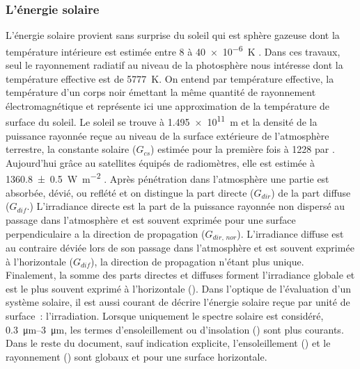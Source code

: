 \subsubsection{L’énergie solaire} %
\label{ssub:l_energie_solaire}
L’énergie solaire provient sans surprise du soleil qui est sphère gazeuse
dont  la température intérieure est estimée entre \num{8} à \SI{40e-6}{\kelvin}
\parencite{Duffie1980}. Dans ces travaux, seul le rayonnement radiatif au niveau de la
photosphère nous intéresse dont la température effective est de \SI{5777}{\kelvin}. On
entend par température effective, la température d’un corps noir émettant la même quantité
de rayonnement électromagnétique et représente ici une approximation de la température de
surface du soleil.
Le soleil se trouve à \SI{1.495e11}{\metre} et la densité de la
puissance rayonnée reçue au niveau de la surface extérieure de l’atmosphère terrestre, la
constante solaire ($G_{cs}$) estimée pour la première fois à \num{1228} par .
Aujourd’hui grâce au satellites équipés de radiomètres, elle est estimée
à \SI{1360.8 +- 0.5}{\watt\per\metre\squared} \parencite{Kopp2011}. Après
pénétration dans l’atmosphère une partie est absorbée, dévié, ou reflété et on distingue
la part directe ($G_{dir}$) de la part diffuse ($G_{dif}$.) L’irradiance directe est la part de la puissance
rayonnée non dispersé au passage dans l’atmosphère et est souvent exprimée pour une surface perpendiculaire
a la direction de propagation ($G_{dir,\,nor}$). L’irradiance diffuse est au contraire
déviée lors de son passage dans l’atmosphère et est souvent exprimée à l’horizontale
($G_{dif}$), la direction de propagation n’étant plus unique. Finalement, la somme des
parts directes et diffuses forment l’irradiance globale et est le plus souvent exprimé à
l’horizontale (). Dans l’optique de l’évaluation d’un système solaire, il est
aussi courant de décrire l’énergie solaire reçue par unité de surface~: l’irradiation.
Lorsque uniquement le spectre solaire est considéré, \SIrange{0.3}{3}{\micro\metre}, les termes
d’ensoleillement ou d’insolation () sont plus courants.
Dans le reste du document, sauf indication explicite, l’ensoleillement () et le rayonnement ()
sont globaux et pour une surface horizontale.

